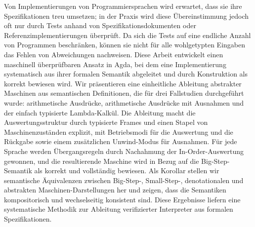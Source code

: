 \begin{center}
\begin{minipage}[t]{0.7\textwidth}
	Von Implementierungen von Programmiersprachen wird erwartet, dass sie ihre Spezifikationen treu umsetzen; in der Praxis wird diese Übereinstimmung jedoch oft nur durch Tests anhand von Spezifikationsdokumenten 
	oder Referenzimplementierungen überprüft. Da sich die Tests auf eine endliche Anzahl von Programmen beschränken, können sie nicht für alle wohlgetypten Eingaben das Fehlen von Abweichungen nachweisen.
	Diese Arbeit entwickelt einen maschinell überprüfbaren Ansatz in Agda, bei dem eine Implementierung systematisch aus ihrer formalen Semantik abgeleitet und durch Konstruktion als korrekt bewiesen wird.
	Wir präsentieren eine einheitliche Ableitung abstrakter Maschinen aus semantischen Definitionen, die für drei Fallstudien durchgeführt wurde: arithmetische Ausdrücke, arithmetische Ausdrücke mit Ausnahmen und der einfach typisierte Lambda-Kalkül.
	Die Ableitung macht die Auswertungsstruktur durch typisierte Frames und einen Stapel von Maschinenzuständen explizit, mit Betriebsmodi für die Auswertung und die Rückgabe sowie einem zusätzlichen Unwind-Modus für Ausnahmen.
	Für jede Sprache werden Übergangsregeln durch Nachahmung der In-Order-Auswertung gewonnen, und die resultierende Maschine wird in Bezug auf die Big-Step-Semantik als korrekt und vollständig bewiesen.
	Als Korollar stellen wir semantische Äquivalenzen zwischen Big-Step-, Small-Step-, denotationalen und abstrakten Maschinen-Darstellungen her und zeigen, dass die Semantiken kompositorisch und wechselseitig konsistent sind.
	Diese Ergebnisse liefern eine systematische Methodik zur Ableitung verifizierter Interpreter aus formalen Spezifikationen.
\end{minipage}
\end{center}

\vfill

\thispagestyle{empty}